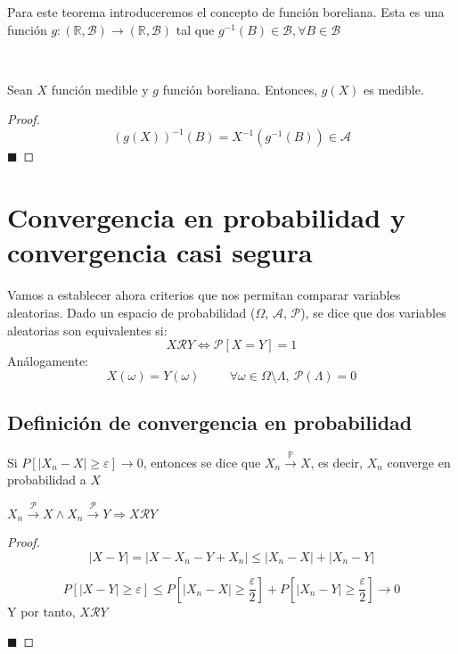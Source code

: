 \documentclass[12pt,a4paper]{book}
\newcommand*{\qed}{\hfill\ensuremath{\blacksquare}}
\begin{document}
Para este teorema introduceremos el concepto de función boreliana. Esta es una función $g:(\mathbb{R},\mathcal{B})\to(\mathbb{R},\mathcal{B})$ tal que $g^{-1}(B)\in \mathcal{B}, \forall B\in\mathcal{B}$

\begin{theorem}
	\
	
Sean $X$ función medible y $g$ función boreliana. Entonces, $g(X)$ es medible.
\end{theorem}

\begin{proof}
$$(g(X))^{-1}(B)=X^{-1}(g^{-1}(B))\in \mathcal{A}$$
\qed
\end{proof}

\section{Convergencia en probabilidad y convergencia casi segura}

Vamos a establecer ahora criterios que nos permitan comparar variables aleatorias. Dado un espacio de probabilidad ($\Omega$, $\mathcal{A}$, $\mathcal{P}$), se dice que dos variables aleatorias son equivalentes si:
$$ X\mathcal{R}Y \Leftrightarrow \mathcal{P}[X = Y] = 1$$
Análogamente:
$$X(\omega) = Y(\omega) \hspace{1cm} \forall \omega \in \Omega \setminus \Lambda, \  \mathcal{P}(\Lambda) = 0$$

\subsection{Definición de convergencia en probabilidad}

Si $P[|X_n- X| \geq \varepsilon]\rightarrow 0$, entonces se dice que $X_n\stackrel{\mathbb{P}}{\longrightarrow} X$, es decir, $X_n$ converge en probabilidad a $X$\\

\begin{lemma}
$X_n\stackrel{\mathcal{P}}{\longrightarrow} X \wedge X_n\stackrel{\mathcal{P}}{\longrightarrow} Y \Longrightarrow X\mathcal{R}Y$\\
\end{lemma}

\begin{proof}
$$|X-Y |=|X - X_n - Y + X_n | \leq |X_n - X|+| X_n-Y |$$

$$P[|X - Y| \geq \varepsilon] \leq P[|X_n - X | \geq \frac{\varepsilon}{2} ] + P[| X_n - Y | \geq \frac{\varepsilon}{2}] \rightarrow 0$$
Y por tanto, $X \mathcal{R} Y$

\qed
\end{proof}
\end{document}
